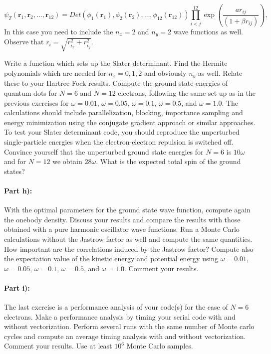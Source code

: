 \documentclass[oneside,final,a4wide,10pt]{article}
\begin{document}
\begin{equation}
   \psi_{T}(\bm{r}_1,\bm{r}_2, \dots,\bm{r}_{12}) = 
   Det\left(\phi_{1}(\bm{r}_1),\phi_{2}(\bm{r}_2),
   \dots,\phi_{12}(\bm{r}_{12})\right)
   \prod_{i<j}^{12}\exp{\left(\frac{ar_{ij}}{(1+\beta r_{ij})}\right)}, 
\end{equation}
In this case you need to include the $n_x=2$ and $n_y=2$ wave functions as well.
Observe that $r_i = \sqrt{r_{i_x}^2+r_{i_y}^2}$.  


Write a function which sets up the Slater determinant. Find the Hermite polynomials which are needed for $n_x=0,1,2$ and obviously $n_y$ as well.  Relate these to your Hartree-Fock results.
Compute the ground state energies of quantum dots for $N=6$ and $N=12$ electrons, following the same set up as in the previous exercises for $\omega=0.01$, $\omega=0.05$,
$\omega=0.1$, $\omega=0.5$, and $\omega=1.0$.
The calculations should include  parallelization, blocking, importance sampling and energy minimization using the conjugate gradient approach or similar approaches.
To test your Slater determinant code, you should reproduce the unperturbed single-particle energies
when the electron-electron repulsion is switched off. Convince yourself that the unperturbed ground state energies for $N=6$ is $10\omega$ and for $N=12$ we obtain $28\omega$. What is the expected total 
spin of the ground states?

\paragraph{Part  h):}
With the optimal parameters for the ground state wave function, compute again the onebody density. Discuss your results and compare the results with those obtained with a pure harmonic oscillator
wave functions. Run a Monte Carlo calculations without the Jastrow factor as well
and compute the same quantities. How important are the correlations induced by the Jastrow factor?
Compute also the expectation value of the kinetic energy and potential energy using $\omega=0.01$,
$\omega=0.05$, $\omega=0.1$, $\omega=0.5$, and $\omega=1.0$. Comment your results.

\paragraph{Part  i):}
The last exercise  is a performance analysis of your code(s) for the case of $N=6$ electrons. Make a performance analysis by timing your serial code
with and without vectorization. Perform several runs with the same number of Monte carlo cycles and compute an average timing analysis
with and without vectorization. Comment your results. Use at least $10^6$ Monte Carlo samples. 
\end{document}
